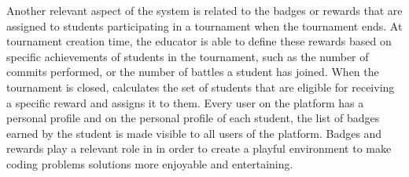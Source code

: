 	Another relevant aspect of the \app system is related to the badges or rewards that are assigned to students participating in a tournament when the tournament ends. At tournament creation time, the educator is able to define these rewards based on specific achievements of students in the tournament, such as the number of commits performed, or the number of battles a student has joined.
	When the tournament is closed, \app calculates the set of students that are eligible for receiving a specific reward and assigns it to them. Every user on the \app platform has a personal profile and on the personal profile of each student, the list of badges earned by the student is made visible to all users of the platform.
	Badges and rewards play a relevant role in \app in order to create a playful environment to make coding problems solutions more enjoyable and entertaining.
